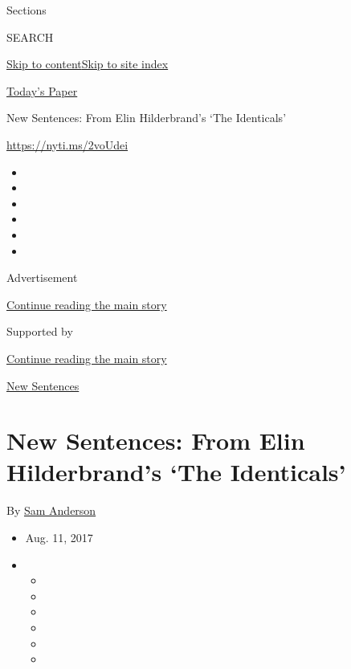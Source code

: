 Sections

SEARCH

\protect\hyperlink{site-content}{Skip to
content}\protect\hyperlink{site-index}{Skip to site index}

\href{https://myaccount.nytimes3xbfgragh.onion/auth/login?response_type=cookie\&client_id=vi}{}

\href{https://www.nytimes3xbfgragh.onion/section/todayspaper}{Today's
Paper}

New Sentences: From Elin Hilderbrand's `The Identicals'

\url{https://nyti.ms/2voUdei}

\begin{itemize}
\item
\item
\item
\item
\item
\item
\end{itemize}

Advertisement

\protect\hyperlink{after-top}{Continue reading the main story}

Supported by

\protect\hyperlink{after-sponsor}{Continue reading the main story}

\href{/column/new-sentences}{New Sentences}

\hypertarget{new-sentences-from-elin-hilderbrands-the-identicals}{%
\section{New Sentences: From Elin Hilderbrand's `The
Identicals'}\label{new-sentences-from-elin-hilderbrands-the-identicals}}

By \href{http://www.nytimes3xbfgragh.onion/by/sam-anderson}{Sam
Anderson}

\begin{itemize}
\item
  Aug. 11, 2017
\item
  \begin{itemize}
  \item
  \item
  \item
  \item
  \item
  \item
  \end{itemize}
\end{itemize}

